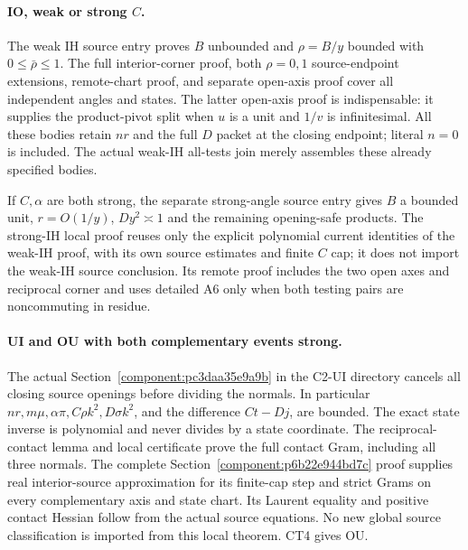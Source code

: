 \paragraph{IO, weak or strong \(C\).}
The weak IH source entry proves \(B\) unbounded and
\(\rho=B/y\) bounded with \(0\leq\bar\rho\leq1\).
The full interior-corner proof, both \(\rho=0,1\) source-endpoint
extensions, remote-chart proof, and separate open-axis proof
cover all independent angles and states.  The latter open-axis
proof is indispensable: it supplies the product-pivot split
when \(u\) is a unit and \(1/v\) is infinitesimal.
All these bodies retain \(nr\) and the full \(D\) packet at the
closing endpoint; literal \(n=0\) is included.
The actual weak-IH all-tests join merely assembles these
already specified bodies.

If \(C,\alpha\) are both strong, the separate strong-angle
source entry gives \(B\) a bounded unit, \(r=O(1/y)\),
\(Dy^2\asymp1\) and the remaining opening-safe products.
The strong-IH local proof reuses only the explicit polynomial
current identities of the weak-IH proof, with its own source
estimates and finite \(C\) cap; it does not import the weak-IH
source conclusion.  Its remote proof includes the two open
axes and reciprocal corner and uses detailed A6 only when
both testing pairs are noncommuting in residue.

\paragraph{UI and OU with both complementary events strong.}
The actual Section~\ref{component:pc3daa35e9a9b} in the C2-UI
directory cancels all closing source openings before dividing
the normals.  In particular \(nr,m\mu,\alpha\pi,C\rho k^2,
D\sigma k^2\), and the difference \(Ct-Dj\), are bounded.
The exact state inverse is polynomial and never divides by
a state coordinate.  The reciprocal-contact lemma and local
certificate prove the full contact Gram, including all three
normals.  The complete Section~\ref{component:p6b22e944bd7c}
proof supplies real interior-source approximation for its
finite-cap step and strict Grams on every complementary
axis and state chart.  Its Laurent equality and positive
contact Hessian follow from the actual source equations.
No new global source classification is imported from this
local theorem.  CT4 gives OU.

